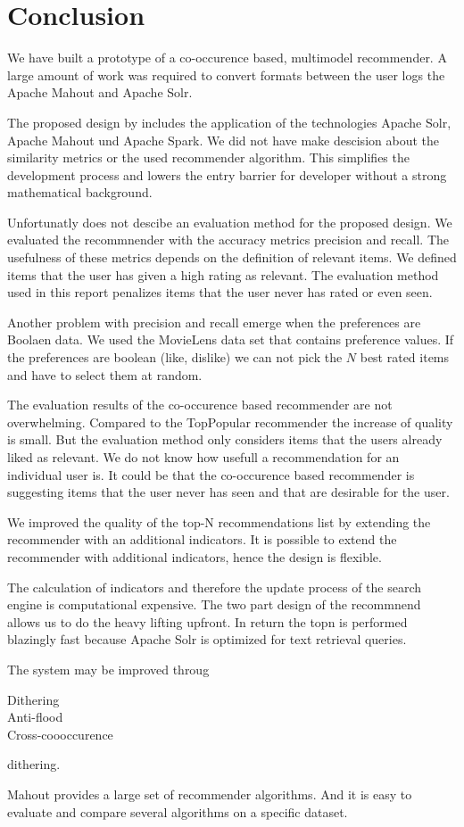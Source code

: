 \section{Conclusion}
\label{sec:conclusion}

We have built a prototype of a co-occurence based, multimodel recommender.
A large amount of work was required to convert formats between the user logs the Apache Mahout and Apache Solr.

The proposed design by \cite{Dunning14} includes the application of the technologies Apache Solr, Apache Mahout und Apache Spark. We did not have make descision about the similarity metrics or the used recommender algorithm. This simplifies the development process and lowers the entry barrier for developer without a strong mathematical background. 

Unfortunatly \cite{Dunning14} does not descibe an evaluation method for the proposed design. We evaluated the recommnender with the accuracy metrics precision and recall. The usefulness of these metrics depends on the definition of relevant items. We defined items that the user has given a high rating as relevant. The evaluation method used in this report penalizes items that the user never has rated or even seen. 

Another problem with precision and recall emerge when the preferences are Boolaen data. We used the MovieLens data set that contains preference values. If the preferences are boolean (like, dislike) we can not pick the $N$ best rated items and have to select them at random.

The evaluation results of the co-occurence based recommender are not overwhelming. Compared to the TopPopular recommender the increase of quality is small. But the evaluation method only considers items that the users already liked as relevant. We do not know how usefull a recommendation for an individual user is. It could be that the co-occurence based recommender is suggesting items that the user never has seen and that are desirable for the user.

We improved the quality of the top-N recommendations list by extending the recommender with an additional indicators. It is possible to extend the recommender with additional indicators, hence the design is flexible.

The calculation of indicators and therefore the update process of the search engine is computational expensive. The two part design of the recommnend allows us to do the heavy lifting upfront. In return the \gls{topn} is performed blazingly fast because Apache Solr is optimized for text retrieval queries. 

The system may be improved throug 
\begin{description}
\item[Dithering] 
\item[Anti-flood] 
\item[Cross-coooccurence]
\end{description}
dithering.

Mahout provides a large set of recommender algorithms. And it is easy to evaluate and compare several algorithms on a specific dataset.
